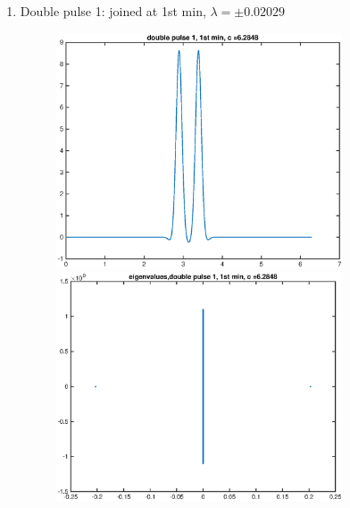 \documentclass[12pt]{article}
\begin{document}
\begin{enumerate}
	\item Double pulse 1: joined at 1st min, $\lambda = \pm 0.02029$
	\begin{figure}[H]
	\includegraphics[width=8.5cm]{2double1.eps}
	\includegraphics[width=8.5cm]{2double1eig.eps}
	\end{figure}


\end{enumerate}
\end{document}
